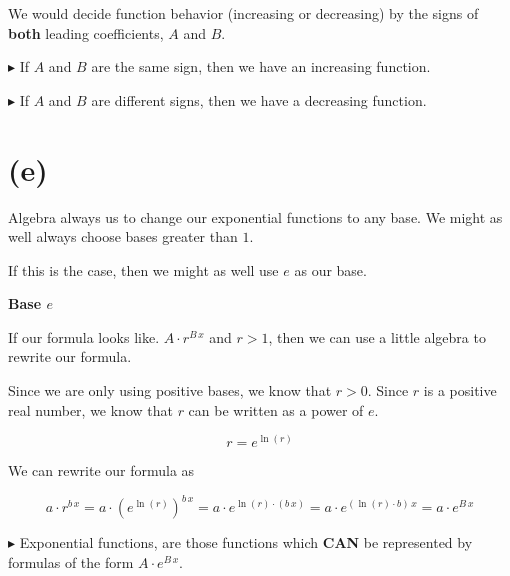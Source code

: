 \documentclass{ximera}
\begin{document}
We would decide function behavior (increasing or decreasing) by the signs of \textbf{both} leading coefficients, $A$ and $B$.

\textbf{\textcolor{red!70!darkgray}{$\blacktriangleright$}} If $A$ and $B$ are the same sign, then we have an increasing function. 

\textbf{\textcolor{red!70!darkgray}{$\blacktriangleright$}} If $A$ and $B$ are different signs, then we have a decreasing function. 








\section*{(e)}



Algebra always us to change our exponential functions to any base.  We might as well always choose bases greater than $1$.


If this is the case, then we might as well use $e$ as our base. 


\begin{explanation} \textbf{\textcolor{red!75!green}{Base $e$}} 


If our formula looks like. $A \cdot r^{B \, x}$ and $r>1$, then we can use a little algebra to rewrite our formula.



Since we are only using positive bases, we know that $r > 0$.  Since $r$ is a positive real number, we know that $r$ can be written as a power of $e$.


\[
r = e^{\ln(r)}
\]



We can rewrite our formula as



\[
a \cdot r^{b \, x} = a \cdot \left( e^{\ln(r)} \right)^{b \, x} = a \cdot  e^{\ln(r) \cdot (b \, x)} = a \cdot  e^{(\ln(r) \cdot b) \, x} = a \cdot  e^{B \, x}
\]


\end{explanation}




\textbf{\textcolor{red!70!darkgray}{$\blacktriangleright$}}  Exponential functions, are those functions which \textbf{\textcolor{red!70!black}{CAN}} be represented by formulas of the form $A \cdot e^{B \, x}$.  
\end{document}

